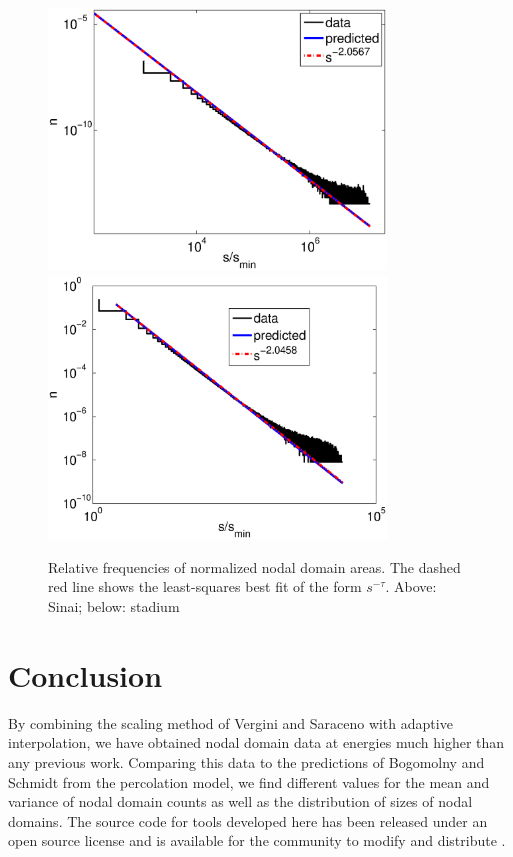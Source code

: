 \documentclass{report}
\begin{document}
\begin{figure}
  \begin{center}
    \includegraphics[width=0.8\textwidth]{figs/results/qugrs_1000_to_1100_sizes.eps}
    \includegraphics[width=0.8\textwidth]{figs/results/qust_700_to_900_sizes_0.1_sampled.eps}
    \caption{Relative frequencies of normalized nodal domain areas. The dashed red line shows the least-squares best fit of the form $s^{-\tau}$. Above: Sinai; below: stadium}
    \label{fig:area}
  \end{center}
\end{figure}

\chapter{Conclusion}
By combining the scaling method of Vergini and Saraceno \cite{vergini} with adaptive interpolation, we have obtained nodal domain data at energies much higher than any previous work. Comparing this data to the predictions of Bogomolny and Schmidt \cite{bogomolny} from the percolation model, we find different values for the mean and variance of nodal domain counts as well as the distribution of sizes of nodal domains. The source code for tools developed here has been released under an open source license \cite{gpl} and is available for the community to modify and distribute \cite{github}.
\end{document}
